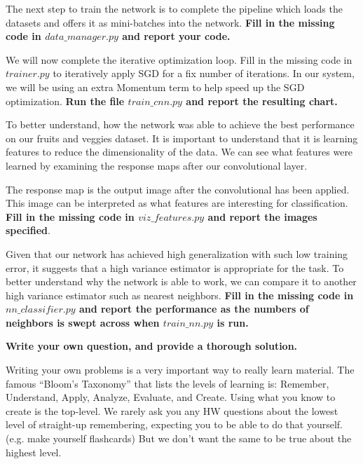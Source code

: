 \begin{Parts}
\Part The next step to train the network is to complete the pipeline which loads the datasets and offers it as mini-batches into the network. {\bf Fill in the missing code in $data\_manager.py$ and report your code.}



\Part We will now complete the iterative optimization loop. Fill in the missing code in $trainer.py$ to iteratively apply SGD for a fix number of iterations. In our system, we will be using an extra Momentum term to help speed up the SGD optimization.  {\bf Run the file $train\_cnn.py$ and report the resulting chart.}



\Part To better understand, how the network was able to achieve the best performance on our fruits and veggies dataset. It is important to understand that it is learning features to reduce the dimensionality of the data. We can see what features were learned by examining the response maps after our convolutional layer.

The response map is the output image after the convolutional has been applied. This image can be interpreted as what features are interesting for classification. {\bf Fill in the missing code in $viz\_features.py$ and report the images specified}.




\Part Given that our network has achieved high generalization with such low training error, it suggests that a high variance estimator is appropriate for the task. To better understand why the network is able to work, we can compare it to another high variance estimator such as nearest neighbors. {\bf Fill in the missing code in $nn\_classifier.py$ and report the performance as the numbers of neighbors is swept across when $train\_nn.py$ is run.}







\end{Parts}


{\bf Write your own question, and provide a thorough solution.}

Writing your own problems is a very important way to really learn
material. The famous ``Bloom's Taxonomy'' that lists the levels of
learning is: Remember, Understand, Apply, Analyze, Evaluate, and
Create. Using what you know to create is the top-level. We rarely ask
you any HW questions about the lowest level of straight-up
remembering, expecting you to be able to do that yourself. (e.g. make
yourself flashcards) But we don't want the same to be true about the
highest level.

